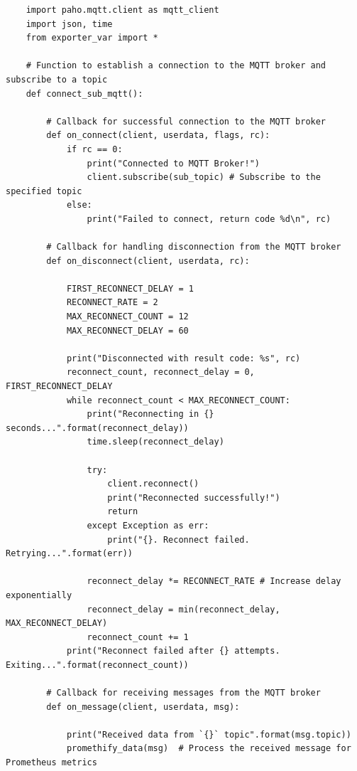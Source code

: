 \begin{verbatim}
    import paho.mqtt.client as mqtt_client
    import json, time
    from exporter_var import *

    # Function to establish a connection to the MQTT broker and subscribe to a topic
    def connect_sub_mqtt():

        # Callback for successful connection to the MQTT broker
        def on_connect(client, userdata, flags, rc):
            if rc == 0:
                print("Connected to MQTT Broker!")
                client.subscribe(sub_topic) # Subscribe to the specified topic
            else:
                print("Failed to connect, return code %d\n", rc)
        
        # Callback for handling disconnection from the MQTT broker
        def on_disconnect(client, userdata, rc):

            FIRST_RECONNECT_DELAY = 1
            RECONNECT_RATE = 2
            MAX_RECONNECT_COUNT = 12
            MAX_RECONNECT_DELAY = 60

            print("Disconnected with result code: %s", rc)
            reconnect_count, reconnect_delay = 0, FIRST_RECONNECT_DELAY
            while reconnect_count < MAX_RECONNECT_COUNT:
                print("Reconnecting in {} seconds...".format(reconnect_delay))
                time.sleep(reconnect_delay)

                try:
                    client.reconnect()
                    print("Reconnected successfully!")
                    return
                except Exception as err:
                    print("{}. Reconnect failed. Retrying...".format(err))

                reconnect_delay *= RECONNECT_RATE # Increase delay exponentially
                reconnect_delay = min(reconnect_delay, MAX_RECONNECT_DELAY)
                reconnect_count += 1
            print("Reconnect failed after {} attempts. Exiting...".format(reconnect_count))

        # Callback for receiving messages from the MQTT broker
        def on_message(client, userdata, msg):

            print("Received data from `{}` topic".format(msg.topic))
            promethify_data(msg)  # Process the received message for Prometheus metrics


\end{verbatim}
